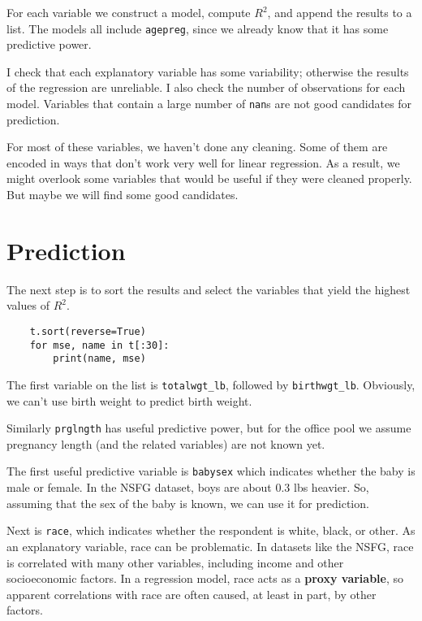 For each variable we construct a model, compute $R^2$, and append
the results to a list.  The models all include {\tt agepreg}, since
we already know that it has some predictive power.

I check that each explanatory variable has some variability; otherwise
the results of the regression are unreliable.  I also check the number
of observations for each model.  Variables that contain a large number
of {\tt nan}s are not good candidates for prediction.

For most of these variables, we haven't done any cleaning.  Some of them
are encoded in ways that don't work very well for linear regression.
As a result, we might overlook some variables that would be useful if
they were cleaned properly.  But maybe we will find some good candidates.


\section{Prediction}

The next step is to sort the results and select the variables that
yield the highest values of $R^2$.

\begin{verbatim}
    t.sort(reverse=True)
    for mse, name in t[:30]:
        print(name, mse)
\end{verbatim}

The first variable on the list is \verb"totalwgt_lb",
followed by \verb"birthwgt_lb".  Obviously, we can't use birth
weight to predict birth weight.

Similarly {\tt prglngth} has useful predictive power, but for the
office pool we assume pregnancy length (and the related variables)
are not known yet.

The first useful predictive variable is {\tt babysex} which indicates
whether the baby is male or female.  In the NSFG dataset, boys are
about 0.3 lbs heavier.  So, assuming that the sex of the baby is
known, we can use it for prediction.

Next is {\tt race}, which indicates whether the respondent is white,
black, or other.  As an explanatory variable, race can be problematic.
In datasets like the NSFG, race is correlated with many other
variables, including income and other socioeconomic factors.  In a
regression model, race acts as a {\bf proxy variable},
so apparent correlations with race are often caused, at least in
part, by other factors.

